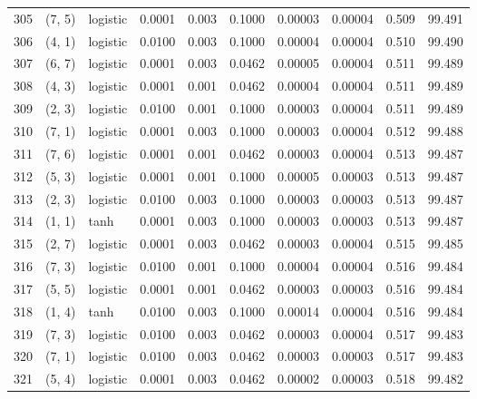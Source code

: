 \begin{tabular}{lllrrrrrrr}
305 &      (7, 5) &  logistic &  0.0001 &  0.003 &  0.1000 &          0.00003 &    0.00004 &       0.509 &    99.491 \\
306 &      (4, 1) &  logistic &  0.0100 &  0.003 &  0.1000 &          0.00004 &    0.00004 &       0.510 &    99.490 \\
307 &      (6, 7) &  logistic &  0.0001 &  0.003 &  0.0462 &          0.00005 &    0.00004 &       0.511 &    99.489 \\
308 &      (4, 3) &  logistic &  0.0001 &  0.001 &  0.0462 &          0.00004 &    0.00004 &       0.511 &    99.489 \\
309 &      (2, 3) &  logistic &  0.0100 &  0.001 &  0.1000 &          0.00003 &    0.00004 &       0.511 &    99.489 \\
310 &      (7, 1) &  logistic &  0.0001 &  0.003 &  0.1000 &          0.00003 &    0.00004 &       0.512 &    99.488 \\
311 &      (7, 6) &  logistic &  0.0001 &  0.001 &  0.0462 &          0.00003 &    0.00004 &       0.513 &    99.487 \\
312 &      (5, 3) &  logistic &  0.0001 &  0.001 &  0.1000 &          0.00005 &    0.00003 &       0.513 &    99.487 \\
313 &      (2, 3) &  logistic &  0.0100 &  0.003 &  0.1000 &          0.00003 &    0.00003 &       0.513 &    99.487 \\
314 &      (1, 1) &      tanh &  0.0001 &  0.003 &  0.1000 &          0.00003 &    0.00003 &       0.513 &    99.487 \\
315 &      (2, 7) &  logistic &  0.0001 &  0.003 &  0.0462 &          0.00003 &    0.00004 &       0.515 &    99.485 \\
316 &      (7, 3) &  logistic &  0.0100 &  0.001 &  0.1000 &          0.00004 &    0.00004 &       0.516 &    99.484 \\
317 &      (5, 5) &  logistic &  0.0001 &  0.001 &  0.0462 &          0.00003 &    0.00003 &       0.516 &    99.484 \\
318 &      (1, 4) &      tanh &  0.0100 &  0.003 &  0.1000 &          0.00014 &    0.00004 &       0.516 &    99.484 \\
319 &      (7, 3) &  logistic &  0.0100 &  0.003 &  0.0462 &          0.00003 &    0.00004 &       0.517 &    99.483 \\
320 &      (7, 1) &  logistic &  0.0100 &  0.003 &  0.0462 &          0.00003 &    0.00003 &       0.517 &    99.483 \\
321 &      (5, 4) &  logistic &  0.0001 &  0.003 &  0.0462 &          0.00002 &    0.00003 &       0.518 &    99.482 \\

\end{tabular}
